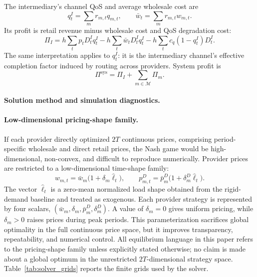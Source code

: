 \documentclass[11pt,a4paper]{article}
\newcommand{\M}{\mathcal{M}}
\newcommand{\D}{D}
\begin{document}
The intermediary's channel QoS and average wholesale cost are
\begin{equation}
  q^I_t=\sum_m r_{m,t}q_{m,t},
  \qquad
  \bar w_t=\sum_m r_{m,t}w_{m,t}.
  \label{eq:intermediary_channel}
\end{equation}
Its profit is retail revenue minus wholesale cost and QoS degradation cost:
\begin{equation}
  \Pi_I
  =h\sum_t p_t\D^I_t q^I_t
  -h\sum_t \bar w_t\D^I_t q^I_t
  -h\sum_t c_q(1-q^I_t)\D^I_t .
  \label{eq:intermediary_profit}
\end{equation}
The same interpretation applies to $q^I_t$: it is the intermediary channel's effective completion factor induced by routing across providers. System profit is
\begin{equation}
  \Pi^{\mathrm{sys}}=\Pi_I+\sum_{m\in\M}\Pi_m .
  \label{eq:system_profit}
\end{equation}

\paragraph{Solution method and simulation diagnostics.}
\label{sec:solver}

\paragraph{Low-dimensional pricing-shape family.}

If each provider directly optimized $2T$ continuous prices, comprising period-specific wholesale and direct retail prices, the Nash game would be high-dimensional, non-convex, and difficult to reproduce numerically. Provider prices are restricted to a low-dimensional time-shape family:
\begin{equation}
  w_{m,t}=\bar w_m\big(1+\delta_m\widehat{\ell}_t\big),
  \qquad
  p^D_{m,t}=\bar p^D_m\big(1+\delta^D_m\widehat{\ell}_t\big).
  \label{eq:shape}
\end{equation}
The vector $\widehat{\ell}_t$ is a zero-mean normalized load shape obtained from the rigid-demand baseline and treated as exogenous. Each provider strategy is represented by four scalars, $(\bar w_m,\delta_m,\bar p^D_m,\delta^D_m)$. A value of $\delta_m=0$ gives uniform pricing, while $\delta_m>0$ raises prices during peak periods. This parameterization sacrifices global optimality in the full continuous price space, but it improves transparency, repeatability, and numerical control. All equilibrium language in this paper refers to the pricing-shape family unless explicitly stated otherwise; no claim is made about a global optimum in the unrestricted $2T$-dimensional strategy space. Table~\ref{tab:solver_grids} reports the finite grids used by the solver.
\end{document}
